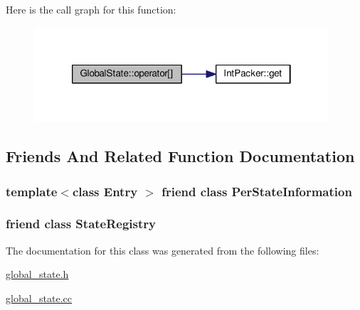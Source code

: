 Here is the call graph for this function\-:
\nopagebreak
\begin{figure}[H]
\begin{center}
\leavevmode
\includegraphics[width=310pt]{classGlobalState_ad00e70e113d5cbdf4e47d3f87d4ca1c2_cgraph}
\end{center}
\end{figure}




\subsection{Friends And Related Function Documentation}
\hypertarget{classGlobalState_a4eefff55b1e2316623deddf37fded3da}{
\subsubsection[{Per\-State\-Information}]{\setlength{\rightskip}{0pt plus 5cm}template$<$class Entry $>$ friend class {\bf Per\-State\-Information}\hspace{0.3cm}{\ttfamily [friend]}}}\label{classGlobalState_a4eefff55b1e2316623deddf37fded3da}
\hypertarget{classGlobalState_ab5efff6db8e98ec0a35ba239b664d5f8}{
\subsubsection[{State\-Registry}]{\setlength{\rightskip}{0pt plus 5cm}friend class {\bf State\-Registry}\hspace{0.3cm}{\ttfamily [friend]}}}\label{classGlobalState_ab5efff6db8e98ec0a35ba239b664d5f8}


The documentation for this class was generated from the following files\-:\begin{DoxyCompactItemize}
\item 
\hyperlink{global__state_8h}{global\-\_\-state.\-h}\item 
\hyperlink{global__state_8cc}{global\-\_\-state.\-cc}\end{DoxyCompactItemize}
